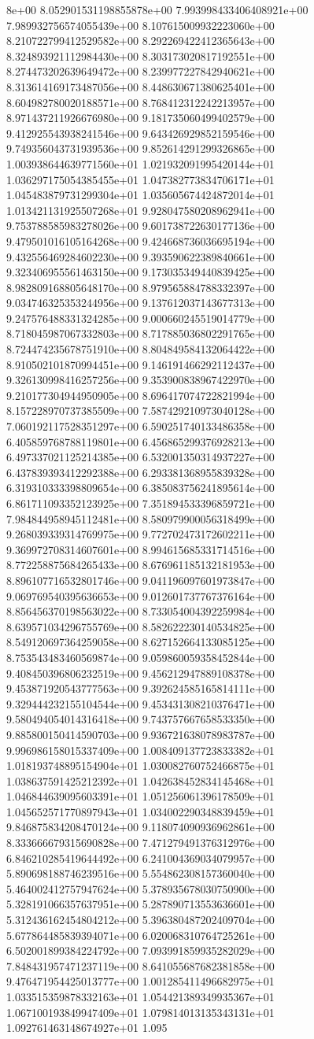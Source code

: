 8e+00	8.052901531198855878e+00	7.993998433406408921e+00	7.989932756574055439e+00	8.107615009932223060e+00	8.210722799412529582e+00	8.292269422412365643e+00	8.324893921112984430e+00	8.303173020817192551e+00	8.274473202639649472e+00	8.239977227842940621e+00	8.313614169173487056e+00	8.448630671380625401e+00	8.604982780020188571e+00	8.768412312242213957e+00	8.971437211926676980e+00	9.181735060499402579e+00	9.412925543938241546e+00	9.643426929852159546e+00	9.749356043731939536e+00	9.852614291299326865e+00	1.003938644639771560e+01	1.021932091995420144e+01	1.036297175054385455e+01	1.047382773834706171e+01	1.045483879731299304e+01	1.035605674424872014e+01	1.013421131925507268e+01	9.928047580208962941e+00	9.753788585983278026e+00	9.601738722630177136e+00	9.479501016105164268e+00	9.424668736036695194e+00	9.432556469284602230e+00	9.393590622389840661e+00	9.323406955561463150e+00	9.173035349440839425e+00	8.982809168805648170e+00	8.979565884788332397e+00	9.034746325353244956e+00	9.137612037143677313e+00	9.247576488331324285e+00	9.000660245519014779e+00	8.718045987067332803e+00	8.717885036802291765e+00	8.724474235678751910e+00	8.804849584132064422e+00	8.910502101870994451e+00	9.146191466292112437e+00	9.326130998416257256e+00	9.353900838967422970e+00	9.210177304944950905e+00	8.696417074722821994e+00	8.157228970737385509e+00	7.587429210973040128e+00	7.060192117528351297e+00	6.590251740133486358e+00	6.405859768788119801e+00	6.456865299376928213e+00	6.497337021125214385e+00	6.532001350314937227e+00	6.437839393412292388e+00	6.293381368955839328e+00	6.319310333398809654e+00	6.385083756241895614e+00	6.861711093352123925e+00	7.351894533396859721e+00	7.984844958945112481e+00	8.580979900056318499e+00	9.268039339314769975e+00	9.772702473172602211e+00	9.369972708314607601e+00	8.994615685331714516e+00	8.772258875684265433e+00	8.676961185132181953e+00	8.896107716532801746e+00	9.041196097601973847e+00	9.069769540395636653e+00	9.012601737767376164e+00	8.856456370198563022e+00	8.733054004392259984e+00	8.639571034296755769e+00	8.582622230140534825e+00	8.549120697364259058e+00	8.627152664133085125e+00	8.753543483460569874e+00	9.059860059358452844e+00	9.408450396806232519e+00	9.456212947889108378e+00	9.453871920543777563e+00	9.392624585165814111e+00	9.329444232155104544e+00	9.453431308210376471e+00	9.580494054014316418e+00	9.743757667658533350e+00	9.885800150414590703e+00	9.936721638078983787e+00	9.996986158015337409e+00	1.008409137723833382e+01	1.018193748895154904e+01	1.030082760752466875e+01	1.038637591425212392e+01	1.042638452834145468e+01	1.046844639095603391e+01	1.051256061396178509e+01	1.045652571770897943e+01	1.034002290348839459e+01	9.846875834208470124e+00	9.118074090936962861e+00	8.333666679315690828e+00	7.471279491376312976e+00	6.846210285419644492e+00	6.241004369034079957e+00	5.890698188746239516e+00	5.554862308157360040e+00	5.464002412757947624e+00	5.378935678030750900e+00	5.328191066357637951e+00	5.287890713553636601e+00	5.312436162454804212e+00	5.396380487202409704e+00	5.677864485839394071e+00	6.020068310764725261e+00	6.502001899384224792e+00	7.093991859935282029e+00	7.848431957471237119e+00	8.641055687682381858e+00	9.476471954425013777e+00	1.001285411496682975e+01	1.033515359878332163e+01	1.054421389349935367e+01	1.067100193849947409e+01	1.079814013135343131e+01	1.092761463148674927e+01	1.095